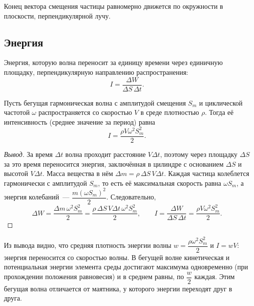 \documentclass[12pt]{article}
\begin{document}
	\begin{definition}
		Конец вектора смещения частицы равномерно движется по окружности в плоскости, перпендикулярной лучу.
	\end{definition}

	\subsection{Энергия}

	\begin{definition}
		Энергия, которую волна переносит за единицу времени через единичную площадку, перпендикулярную направлению распространения:
		\[
			I = \dfrac{\varDelta W}{\varDelta S\,\varDelta t}.
		\]
	\end{definition}

	\begin{statement}
		Пусть бегущая гармоническая волна с амплитудой смещения $S_m$ и циклической частотой $\omega$ распространяется со скоростью $V$ в среде плотностью $\rho$. Тогда её интенсивность (среднее значение за период) равна
		\[
			I = \dfrac{\rho V \omega^2 S_m^2}{2}.
		\]
	\end{statement}
	\begin{proof}[Вывод]
		За время $\varDelta t$ волна проходит расстояние $V\varDelta t$, поэтому через площадку $\varDelta S$ за это время переносится энергия, заключённая в цилиндре с основанием $\varDelta S$ и высотой $V\varDelta t$. Масса вещества в нём $\varDelta m = \rho\,\varDelta S\,V\varDelta t$. Каждая частица колеблется гармонически с амплитудой $S_m$, то есть её максимальная скорость равна $\omega S_m$, а энергия колебаний~--- $\dfrac{m (\omega S_m)^2}{2}$. Следовательно,
		\[
			\varDelta W = \dfrac{\varDelta m\,\omega^2 S_m^2}{2} = \dfrac{\rho\,\varDelta S\,V\varDelta t\,\omega^2 S_m^2}{2}, \qquad I = \dfrac{\varDelta W}{\varDelta S\,\varDelta t} = \dfrac{\rho V \omega^2 S_m^2}{2}.
		\]
	\end{proof}

	\begin{note}
		Из вывода видно, что средняя плотность энергии волны $w = \dfrac{\rho \omega^2 S_m^2}{2}$ и $I = wV$: энергия переносится со скоростью волны. В бегущей волне кинетическая и потенциальная энергии элемента среды достигают максимума одновременно (при прохождении положения равновесия) и в среднем равны, по $\dfrac{w}{2}$ каждая. Этим бегущая волна отличается от маятника, у которого энергии переходят друг в друга.
	\end{note}
\end{document}
